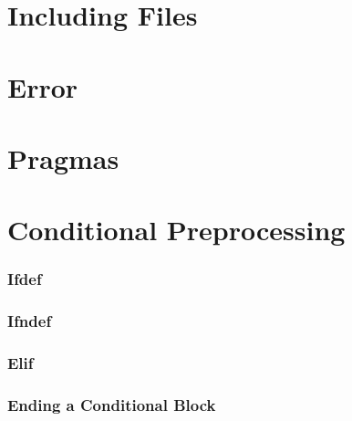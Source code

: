 \section{Including Files}

\section{Error}

\section{Pragmas}

\section{Conditional Preprocessing}

\subsubsection{Ifdef}
\subsubsection{Ifndef}
\subsubsection{Elif}

\subsubsection{Ending a Conditional Block}


